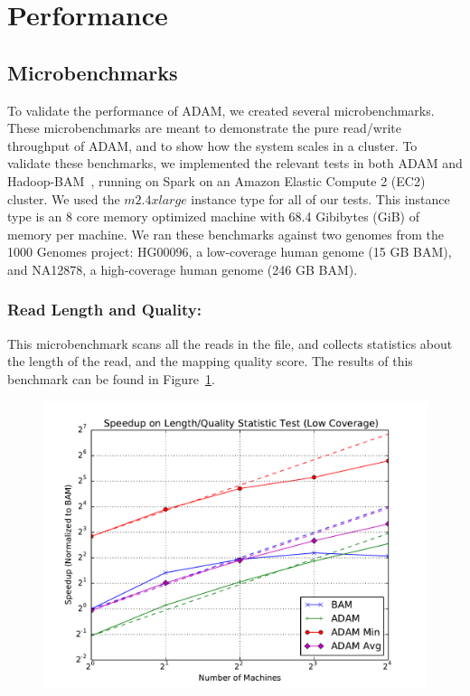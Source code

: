 \documentclass[10pt,twocolumn]{article}
\begin{document}
\section{Performance}
\label{sec:performance}

\subsection{Microbenchmarks}
\label{sec:microbenchmarks}

To validate the performance of ADAM, we created several microbenchmarks. These microbenchmarks are meant to demonstrate
the pure read/write throughput of ADAM, and to show how the system scales in a cluster. To validate these benchmarks, we implemented
the relevant tests in both ADAM and Hadoop-BAM~\cite{niemenmaa12}, running on Spark on an Amazon Elastic Compute 2 (EC2)
cluster. We used the $m2.4xlarge$ instance type for all of our tests. This instance type is an 8 core memory optimized machine
with 68.4 Gibibytes (GiB) of memory per machine. We ran these benchmarks against two genomes from the 1000 Genomes project:
HG00096, a low-coverage human genome (15 GB BAM), and NA12878, a high-coverage human genome (246 GB BAM).

\subsubsection{Read Length and Quality:} 
\label{sec:read-length-and-quality}

This microbenchmark scans all the reads in the file, and collects statistics about the length of the read, and the mapping quality score.
The results of this benchmark can be found in Figure~\ref{fig:length-quality}.

\begin{figure}[h]
\begin{center}
\includegraphics[width=\linewidth]{microbenchmarks/length_and_quality_low_coverage.pdf}
\end{center}
\label{fig:length-quality}
\end{figure}
\end{document}
